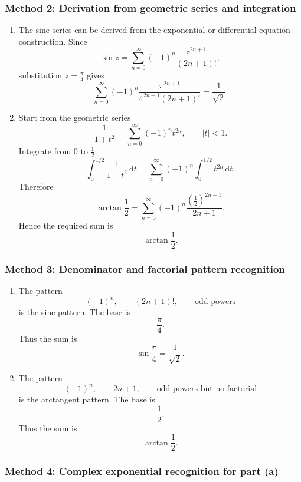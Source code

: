 \documentclass[12pt]{article}
\newcommand{\dd}{\,\mathrm{d}}
\begin{document}
\newpage
\subsubsection{Method 2: Derivation from geometric series and integration}

\begin{enumerate}[label=(\alph*)]

\item
The sine series can be derived from the exponential or differential-equation construction.
Since
\[
\sin z
=
\sum_{n=0}^{\infty}(-1)^n\frac{z^{2n+1}}{(2n+1)!},
\]
substitution \(z=\frac{\pi}{4}\) gives
\[
\boxed{
\sum_{n=0}^{\infty}(-1)^n\frac{\pi^{2n+1}}{4^{2n+1}(2n+1)!}
=
\frac{1}{\sqrt2}.
}
\]

\item
Start from the geometric series
\[
\frac{1}{1+t^2}
=
\sum_{n=0}^{\infty}(-1)^n t^{2n},
\qquad |t|<1.
\]
Integrate from \(0\) to \(\frac12\):
\[
\int_0^{1/2}\frac{1}{1+t^2}\dd t
=
\sum_{n=0}^{\infty}(-1)^n
\int_0^{1/2}t^{2n}\dd t.
\]
Therefore
\[
\arctan\frac12
=
\sum_{n=0}^{\infty}(-1)^n
\frac{\left(\frac12\right)^{2n+1}}{2n+1}.
\]
Hence the required sum is
\[
\boxed{\arctan\frac12.}
\]

\end{enumerate}

\newpage
\subsubsection{Method 3: Denominator and factorial pattern recognition}

\begin{enumerate}[label=(\alph*)]

\item
The pattern
\[
(-1)^n,\qquad (2n+1)!,\qquad \text{odd powers}
\]
is the sine pattern. The base is
\[
\frac{\pi}{4}.
\]
Thus the sum is
\[
\boxed{\sin\frac{\pi}{4}=\frac1{\sqrt2}.}
\]

\item
The pattern
\[
(-1)^n,\qquad 2n+1,\qquad \text{odd powers but no factorial}
\]
is the arctangent pattern. The base is
\[
\frac12.
\]
Thus the sum is
\[
\boxed{\arctan\frac12.}
\]

\end{enumerate}


\bigskip
\subsubsection{Method 4: Complex exponential recognition for part (a)}
\end{document}
